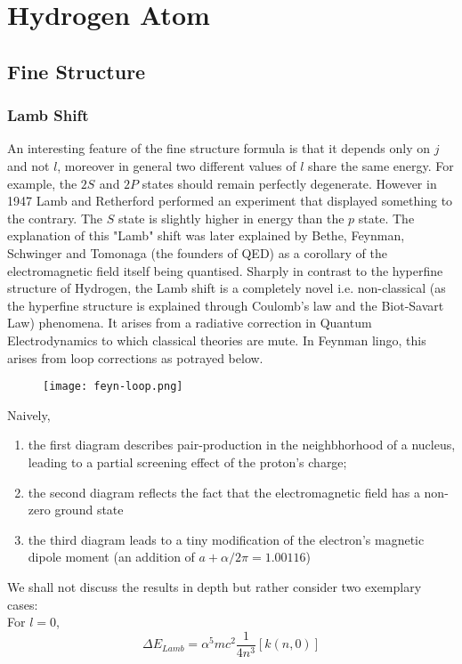 \chapter{Hydrogen Atom}
\section{Fine Structure}
\subsection{Lamb Shift}
An interesting feature of the fine structure formula is that it depends only on $j$ and not $l$, moreover in general two different values of $l$ share the same energy. For example, the $2S_{}$ and $2P$ states should remain perfectly degenerate. However in 1947 Lamb and Retherford performed an experiment that displayed something to the contrary. The $S$ state is slightly higher in energy than the $p$ state. The explanation of this "Lamb" shift was later explained by Bethe, Feynman, Schwinger and Tomonaga (the founders of QED) as a corollary of the electromagnetic field itself being quantised.  Sharply in contrast to the hyperfine structure of Hydrogen, the Lamb shift is a completely novel i.e. non-classical (as the hyperfine structure is explained through Coulomb's law and the Biot-Savart Law) phenomena. It arises from a radiative correction in Quantum Electrodynamics to which classical theories are mute. In Feynman lingo, this arises from loop corrections as potrayed below.
\begin{figure}[h]
	\centering
	\texttt{[image: feyn-loop.png]}
\end{figure}
Naively,
\begin{enumerate}
\item the first diagram describes pair-production in the neighbhorhood of a nucleus, leading to a partial screening effect of the proton's charge;
\item the second diagram reflects the fact that the electromagnetic field has a non-zero ground state
\item the third diagram leads to a tiny modification of the electron's magnetic dipole moment (an addition of $a + \alpha/2\pi = 1.00116$)
\end{enumerate}
We shall not discuss the results in depth but rather consider two exemplary cases:\\
For $ l = 0$,
\begin{equation}
	\Delta E_{Lamb} = \alpha^{5}mc^{2}\frac{1}{4n^{3}}\left[k(n,0)\right]
\end{equation}
